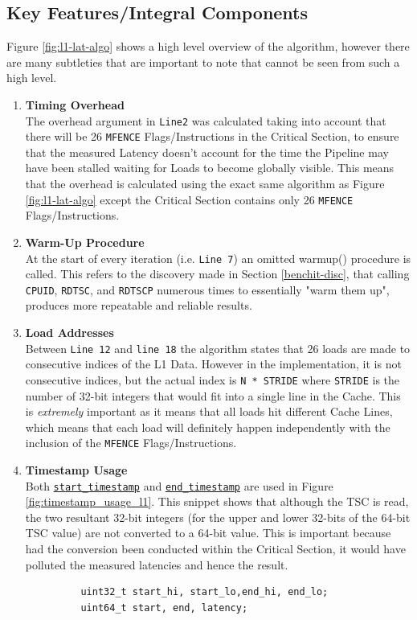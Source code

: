 \documentclass[bsc,frontabs,twoside,singlespacing,parskip,deptreport]{infthesis}     %
\begin{document}
\subsection{Key Features/Integral Components}\label{sec:l1-lat-key-comp}
Figure \ref{fig:l1-lat-algo} shows a high level overview of the algorithm, however there are many subtleties that are important to note that cannot be seen from such a high level.
\begin{enumerate}
    \item{{\bf Timing Overhead} \\
    The overhead argument in \texttt{Line2} was calculated taking into account that there will be 26 \texttt{MFENCE} Flags/Instructions in the Critical Section, to ensure that the measured Latency doesn't account for the time the Pipeline may have been stalled waiting for Loads to become globally visible. This means that the overhead is calculated using the exact same algorithm as Figure \ref{fig:l1-lat-algo} except the Critical Section contains only 26 \texttt{MFENCE} Flags/Instructions.}\label{timing-overhead-consideration-L1}
    
    \item{{\bf Warm-Up Procedure} \\
    At the start of every iteration (i.e. \texttt{Line 7}) an omitted warmup() procedure is called. This refers to the discovery made in Section \ref{benchit-disc}, that calling \texttt{CPUID}, \texttt{RDTSC}, and \texttt{RDTSCP} numerous times to essentially "warm them up", produces more repeatable and reliable results. }
    
    \item{{\bf Load Addresses} \\
    Between \texttt{Line 12} and \texttt{line 18} the algorithm states that 26 loads are made to consecutive indices of the L1 Data. However in the implementation, it is not consecutive indices, but the actual index is \texttt{N * STRIDE} where \texttt{STRIDE} is the number of 32-bit integers that would fit into a single line in the Cache. This is \emph{extremely} important as it means that all loads hit different Cache Lines, which means that each load will definitely happen independently with the inclusion of the \texttt{MFENCE} Flags/Instructions.}
    
    \item{{\bf Timestamp Usage} \\
    Both \hyperref[fig:starttimestamp-code]{\texttt{start\_timestamp}} and \hyperref[fig:endtimestamp-code]{\texttt{end\_timestamp}} are used in Figure \ref{fig:timestamp_usage_l1}. This snippet shows that although the TSC is read, the two resultant 32-bit integers (for the upper and lower 32-bits of the 64-bit TSC value) are not converted to a 64-bit value. This is important because had the conversion been conducted within the Critical Section, it would have polluted the measured latencies and hence the result.
    \begin{figure}[h!]
        \centering
        \begin{verbatim}
    uint32_t start_hi, start_lo,end_hi, end_lo;
    uint64_t start, end, latency;
    

\end{verbatim}
\end{figure}}
\end{enumerate}
\end{document}
